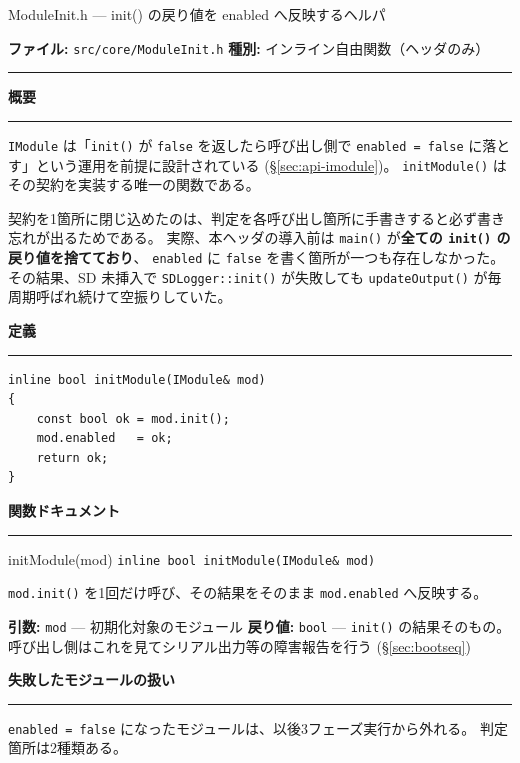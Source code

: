 \documentclass[a4paper,11pt,dvipdfmx]{jsarticle}
\makeatletter
\newcommand{\apisection}[1]{%
  \par\addvspace{4mm}%
  {\normalsize\bfseries\color{headerblue} #1}%
  \par\vspace{-1mm}%
  {\color{accentblue!40}\rule{\linewidth}{0.5pt}}%
  \par\nobreak\vspace{2mm}%
  \@afterheading
}
\makeatother
\begin{document}
\begin{apibox}{ModuleInit.h --- init() の戻り値を enabled へ反映するヘルパ}

\textbf{ファイル:} \texttt{src/core/ModuleInit.h} \hfill
\textbf{種別:} インライン自由関数（ヘッダのみ）

\vspace{2mm}\hrule\vspace{2mm}

\apisection{概要}

\texttt{IModule} は「\texttt{init()} が \texttt{false} を返したら呼び出し側で
\texttt{enabled = false} に落とす」という運用を前提に設計されている
(\hyperref[sec:api-imodule]{§\ref*{sec:api-imodule}})。
\texttt{initModule()} はその契約を実装する唯一の関数である。

契約を1箇所に閉じ込めたのは、判定を各呼び出し箇所に手書きすると必ず書き忘れが出るためである。
実際、本ヘッダの導入前は \texttt{main()} が\textbf{全ての \texttt{init()} の戻り値を捨てており}、
\texttt{enabled} に \texttt{false} を書く箇所が一つも存在しなかった。
その結果、SD 未挿入で \texttt{SDLogger::init()} が失敗しても
\texttt{updateOutput()} が毎周期呼ばれ続けて空振りしていた。

\apisection{定義}

\begin{lstlisting}[caption={initModule() の定義 (core/ModuleInit.h)},label=lst:moduleinit]
inline bool initModule(IModule& mod)
{
    const bool ok = mod.init();
    mod.enabled   = ok;
    return ok;
}
\end{lstlisting}

\apisection{関数ドキュメント}

\begin{funcblock}{initModule(mod)}
\texttt{inline bool initModule(IModule\& mod)}

\vspace{1.5mm}
\texttt{mod.init()} を1回だけ呼び、その結果をそのまま \texttt{mod.enabled} へ反映する。

\vspace{1.5mm}
\textbf{引数:} \texttt{mod} --- 初期化対象のモジュール\quad
\textbf{戻り値:} \texttt{bool} --- \texttt{init()} の結果そのもの。
呼び出し側はこれを見てシリアル出力等の障害報告を行う
(\hyperref[sec:bootseq]{§\ref*{sec:bootseq}})
\end{funcblock}

\apisection{失敗したモジュールの扱い}

\texttt{enabled = false} になったモジュールは、以後3フェーズ実行から外れる。
判定箇所は2種類ある。


\end{apibox}
\end{document}
